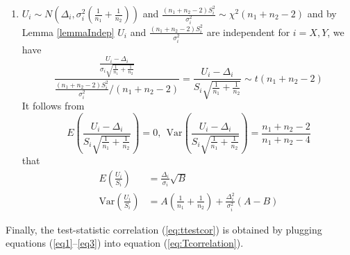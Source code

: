 \documentclass[12pt, a4paper]{article}
\newcommand{\var}{\text{Var}}
\begin{document}
\begin{enumerate}
		\item $U_i\sim N\left(\Delta_i, \sigma_i^2(\frac{1}{n_1} + \frac{1}{n_2})\right)$ and 
		$\frac{(n_1 + n_2 -2)S_i^2}{\sigma_i^2} \sim
		\chi^2(n_1 + n_2-2)$ and by Lemma \ref{lemmaIndep}  $U_i$ and $\frac{(n_1 + n_2 
			-2)S_i^2}{\sigma_i^2}$ are independent for $i = X, Y$, we have 
		\begin{equation}
		\frac{\frac{U_i-\Delta_i}{\sigma_i\sqrt{\frac{1}{n_1} + \frac{1}{n_2}}}}{\frac{(n_1 + 
				n_2-2)S_i^2}{\sigma_i^2}/(n_1 + n_2 -2)}  =
		\frac{U_i-\Delta_i}{S_i\sqrt{\frac{1}{n_1 } + \frac{1}{n_2}}}\sim t(n_1 + n_2-2)
		\end{equation}	
		It follows from 
		\begin{equation}
		E\left(\frac{U_i-\Delta_i}{S_i\sqrt{\frac{1}{n_1} + \frac{1}{n_2}}}\right)=0, ~~ 
		\text{Var}\left(\frac{U_i-\Delta_i}{S_i\sqrt{\frac{1}{n_1} + \frac{1}{n_2}}}\right) = 
		\frac{n_1 + n_2-2}{n_1 + n_2-4}
		\end{equation}
		that
		\begin{equation}\label{eq3}
		\begin{aligned}
		E\left(\frac{U_i}{S_i}\right) &= \frac{\Delta_i}{\sigma_i}\sqrt{B} \\
		\var\left(\frac{U_i}{S_i}\right)&=A\left(\frac{1}{n_1} + \frac{1}{n_2}\right) + 
		\frac{\Delta_i^2}{\sigma_i^2}(A-B)
		\end{aligned}
		\end{equation}
	\end{enumerate}
	Finally,  the test-statistic correlation (\ref{eq:ttestcor}) is obtained by plugging
	equations (\ref{eq1}--\ref{eq3}) into equation (\ref{eq:Tcorrelation}).
	
\end{document}
